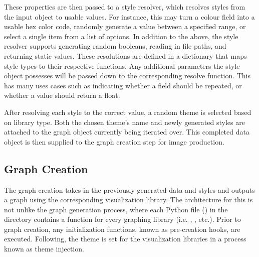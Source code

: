 These properties are then passed to a style resolver, which resolves styles from the input object to usable values. For instance, this may turn a colour field into a usable hex color code, randomly generate a value between a specified range, or select a single item from a list of options. In addition to the above, the style resolver supports generating random booleans, reading in  file paths, and returning static values. These resolutions are defined in a dictionary that maps style types to their respective functions. Any additional parameters the style object possesses will be passed down to the corresponding resolve function. This has many uses cases such as indicating whether a field should be repeated, or whether a value should return a float.

\hfill

After resolving each style to the correct value, a random theme is selected based on library type. Both the chosen theme's name and newly generated styles are attached to the graph object currently being iterated over. This completed data object is then supplied to the graph creation step for image production.

\subsection{Graph Creation}
The graph creation takes in the previously generated data and styles and outputs a graph using the corresponding visualization library. The architecture for this is not unlike the graph generation process, where each Python file () in the  directory contains a function for every graphing library (i.e. , , etc.). Prior to graph creation, any initialization functions, known as pre-creation hooks, are executed. Following, the theme is set for the visualization libraries in a process known as theme injection.

